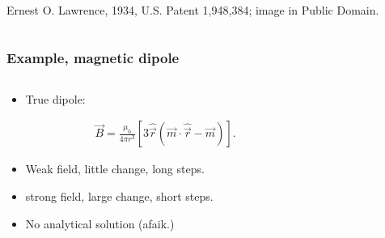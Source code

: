 \documentclass{beamer}
\begin{document}
\begin{frame}
\begin{columns}
\begin{column}{0.5\linewidth}
{{\color{gray} Ernest O. Lawrence, 1934, U.S. Patent 1,948,384; image in Public Domain.}
}%

\end{column}
\end{columns}
\end{frame}


\begin{frame}
\frametitle{Example, magnetic dipole}

\begin{columns}
\begin{column}{0.5\linewidth}
\begin{itemize}

\item <1-> True dipole:

\begin{align*}
\vec{B} = \frac{\mu_0}{4\pi r^3} \left[3 \hat{\vec{r}}(\vec{m}\cdot\hat{\vec{r}} -\vec{m}) \right].
\end{align*}

\item <2-> Weak field, little change, long steps.

\item <3-> strong field, large change, short steps.

\item <4-> No analytical solution (afaik.)


\end{itemize}
\end{column}
\begin{column}{0.5\linewidth}



\end{column}
\end{columns}
\end{frame}
\end{document}
